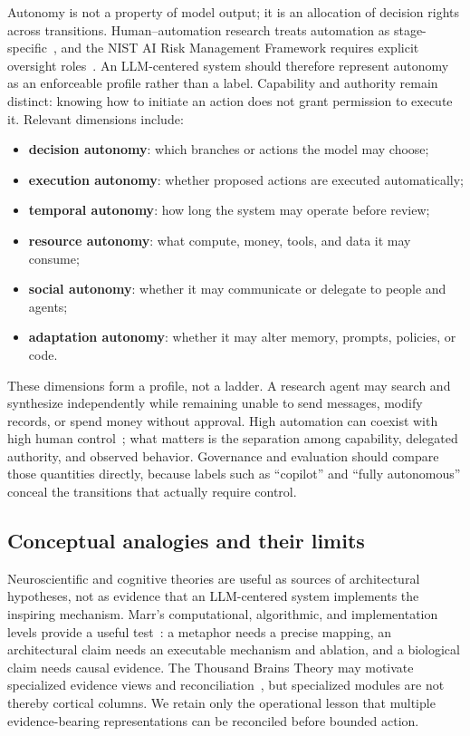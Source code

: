 Autonomy is not a property of model output; it is an allocation of decision rights across transitions. Human--automation research treats automation as stage-specific~\cite{parasuraman2000levels}, and the NIST AI Risk Management Framework requires explicit oversight roles~\cite{tabassi2023airmf}. An LLM-centered system should therefore represent autonomy as an enforceable profile rather than a label. Capability and authority remain distinct: knowing how to initiate an action does not grant permission to execute it. Relevant dimensions include:
\begin{itemize}
    \item \textbf{decision autonomy}: which branches or actions the model may choose;
    \item \textbf{execution autonomy}: whether proposed actions are executed automatically;
    \item \textbf{temporal autonomy}: how long the system may operate before review;
    \item \textbf{resource autonomy}: what compute, money, tools, and data it may consume;
    \item \textbf{social autonomy}: whether it may communicate or delegate to people and agents;
    \item \textbf{adaptation autonomy}: whether it may alter memory, prompts, policies, or code.
\end{itemize}
These dimensions form a profile, not a ladder. A research agent may search and synthesize independently while remaining unable to send messages, modify records, or spend money without approval. High automation can coexist with high human control~\cite{shneiderman2020hcai}; what matters is the separation among capability, delegated authority, and observed behavior. Governance and evaluation should compare those quantities directly, because labels such as ``copilot'' and ``fully autonomous'' conceal the transitions that actually require control.

\subsection{Conceptual analogies and their limits}

Neuroscientific and cognitive theories are useful as sources of architectural hypotheses, not as evidence that an LLM-centered system implements the inspiring mechanism. Marr's computational, algorithmic, and implementation levels provide a useful test~\cite{marr1982vision}: a metaphor needs a precise mapping, an architectural claim needs an executable mechanism and ablation, and a biological claim needs causal evidence. The Thousand Brains Theory may motivate specialized evidence views and reconciliation~\cite{hawkins2021thousandbrains}, but specialized modules are not thereby cortical columns. We retain only the operational lesson that multiple evidence-bearing representations can be reconciled before bounded action.

